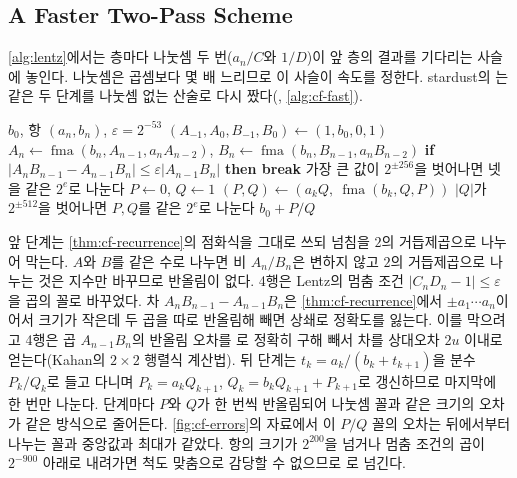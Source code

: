 \subsection{A Faster Two-Pass Scheme}

\cref{alg:lentz}에서는 층마다 나눗셈 두 번($a_n/C$와 $1/D$)이 앞 층의 결과를 기다리는 사슬에 놓인다. 나눗셈은 곱셈보다 몇 배 느리므로 이 사슬이 속도를 정한다. stardust의 는 같은 두 단계를 나눗셈 없는 산술로 다시 짰다(, \cref{alg:cf-fast}).

\begin{algorithm}[htbp]
\begin{algorithmic}[1]
\Require $b_0$, 항 $(a_n,b_n)$, $\varepsilon=2^{-53}$
\State $(A_{-1},A_0,B_{-1},B_0)\gets(1,b_0,0,1)$
 
  \State $A_n\gets\operatorname{fma}(b_n,A_{n-1},a_nA_{n-2})$, $B_n\gets\operatorname{fma}(b_n,B_{n-1},a_nB_{n-2})$
  \State \textbf{if} $|A_nB_{n-1}-A_{n-1}B_n|\le\varepsilon|A_{n-1}B_n|$ \textbf{then break} 
  \State 가장 큰 값이 $2^{\pm256}$을 벗어나면 넷을 같은 $2^e$로 나눈다 
\EndFor
\State $P\gets0$, $Q\gets1$
 
  \State $(P,Q)\gets(a_kQ,\ \operatorname{fma}(b_k,Q,P))$
  \State $|Q|$가 $2^{\pm512}$을 벗어나면 $P,Q$를 같은 $2^e$로 나눈다
\EndFor
\State \Return $b_0+P/Q$ 
\end{algorithmic}
\caption{나눗셈 없는 두 단계 연분수 계산 (stardust )}
\label{alg:cf-fast}
\end{algorithm}

앞 단계는 \cref{thm:cf-recurrence}의 점화식을 그대로 쓰되 넘침을 $2$의 거듭제곱으로 나누어 막는다. $A$와 $B$를 같은 수로 나누면 비 $A_n/B_n$은 변하지 않고 $2$의 거듭제곱으로 나누는 것은 지수만 바꾸므로 반올림이 없다. 4행은 Lentz의 멈춤 조건 $|C_nD_n-1|\le\varepsilon$을 곱의 꼴로 바꾸었다. 차 $A_nB_{n-1}-A_{n-1}B_n$은 \cref{thm:cf-recurrence}에서 $\pm a_1\cdots a_n$이어서 크기가 작은데 두 곱을 따로 반올림해 빼면 상쇄로 정확도를 잃는다. 이를 막으려고 4행은 곱 $A_{n-1}B_n$의 반올림 오차를 로 정확히 구해 빼서 차를 상대오차 $2u$ 이내로 얻는다(Kahan의 $2\times2$ 행렬식 계산법). 뒤 단계는 $t_k=a_k/(b_k+t_{k+1})$을 분수 $P_k/Q_k$로 들고 다니며 $P_k=a_kQ_{k+1}$, $Q_k=b_kQ_{k+1}+P_{k+1}$로 갱신하므로 마지막에 한 번만 나눈다. 단계마다 $P$와 $Q$가 한 번씩 반올림되어 나눗셈 꼴과 같은 크기의 오차가 같은 방식으로 줄어든다. \cref{fig:cf-errors}의 자료에서 이 $P/Q$ 꼴의 오차는 뒤에서부터 나누는 꼴과 중앙값과 최대가 같았다. 항의 크기가 $2^{200}$을 넘거나 멈춤 조건의 곱이 $2^{-900}$ 아래로 내려가면 척도 맞춤으로 감당할 수 없으므로 로 넘긴다.


